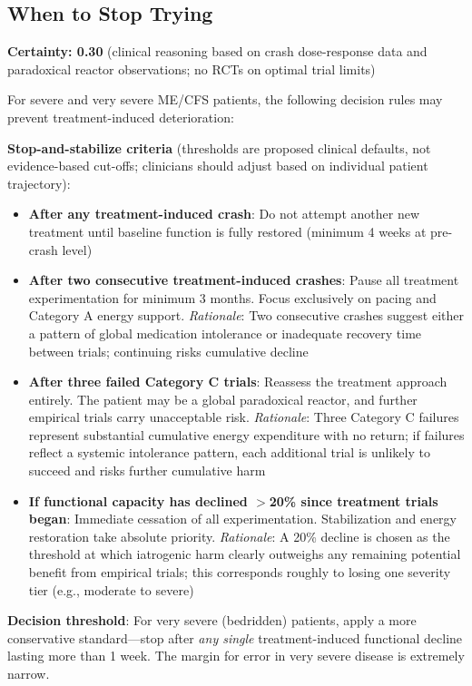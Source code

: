 \subsection{When to Stop Trying}
\label{subsec:when-to-stop}

\begin{directive}
\label{dir:treatment-trial-limits}

\textbf{Certainty: 0.30} (clinical reasoning based on crash dose-response data and paradoxical reactor observations; no RCTs on optimal trial limits)

For severe and very severe ME/CFS patients, the following decision rules may prevent treatment-induced deterioration:

\textbf{Stop-and-stabilize criteria} (thresholds are proposed clinical defaults, not evidence-based cut-offs; clinicians should adjust based on individual patient trajectory):
\begin{itemize}
    \item \textbf{After any treatment-induced crash}: Do not attempt another new treatment until baseline function is fully restored (minimum 4 weeks at pre-crash level)
    \item \textbf{After two consecutive treatment-induced crashes}: Pause all treatment experimentation for minimum 3 months. Focus exclusively on pacing and Category A energy support. \textit{Rationale}: Two consecutive crashes suggest either a pattern of global medication intolerance or inadequate recovery time between trials; continuing risks cumulative decline
    \item \textbf{After three failed Category C trials}: Reassess the treatment approach entirely. The patient may be a global paradoxical reactor, and further empirical trials carry unacceptable risk. \textit{Rationale}: Three Category C failures represent substantial cumulative energy expenditure with no return; if failures reflect a systemic intolerance pattern, each additional trial is unlikely to succeed and risks further cumulative harm
    \item \textbf{If functional capacity has declined $>$20\% since treatment trials began}: Immediate cessation of all experimentation. Stabilization and energy restoration take absolute priority. \textit{Rationale}: A 20\% decline is chosen as the threshold at which iatrogenic harm clearly outweighs any remaining potential benefit from empirical trials; this corresponds roughly to losing one severity tier (e.g., moderate to severe)
\end{itemize}

\textbf{Decision threshold}: For very severe (bedridden) patients, apply a more conservative standard---stop after \textit{any single} treatment-induced functional decline lasting more than 1 week. The margin for error in very severe disease is extremely narrow.
\end{directive}

